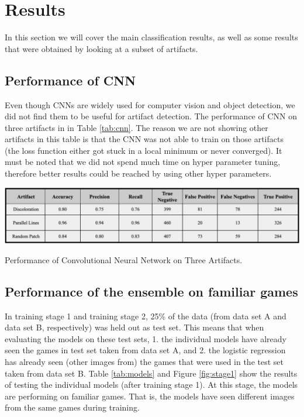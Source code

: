\chapter{Results}\label{Ch:results}




In this section we will cover the main classification results, as well as some results that were obtained by looking at a subset of artifacts.
\section{Performance of CNN}
Even though CNNs are widely used for computer vision and object detection, we did not find them to be useful for artifact detection. The performance of CNN on three artifacts in in Table \ref{tab:cnn}. The reason we are not showing other artifacts in this table is that the CNN was not able to train on those artifacts (the loss function either got stuck in a local minimum or never converged). It must be noted that we did not spend much time on hyper parameter tuning, therefore better results could be reached by using other hyper parameters.

\begin{table}[h]
    \centering
    \includegraphics[scale=0.4]{images/CNN.png}
    \caption{Performance of Convolutional Neural Network  on Three Artifacts.}
    \label{tab:cnn}
\end{table}

\section{Performance of the ensemble on familiar games}
In training stage 1 and training stage 2, 25\% of the data (from data set A and data set B, respectively) was held out as test set. This means that when evaluating the models on these test sets, 1. the individual models have already seen the games in test set taken from data set A, and 2. the logistic regression has already seen (other images from) the games that were used in the test set taken from data set B. Table \ref{tab:models} and Figure \ref{fig:stage1} show the results of testing the individual models (after training stage 1). At this stage, the models are performing on familiar games. That is, the models have seen different images from the same games during training.\\

